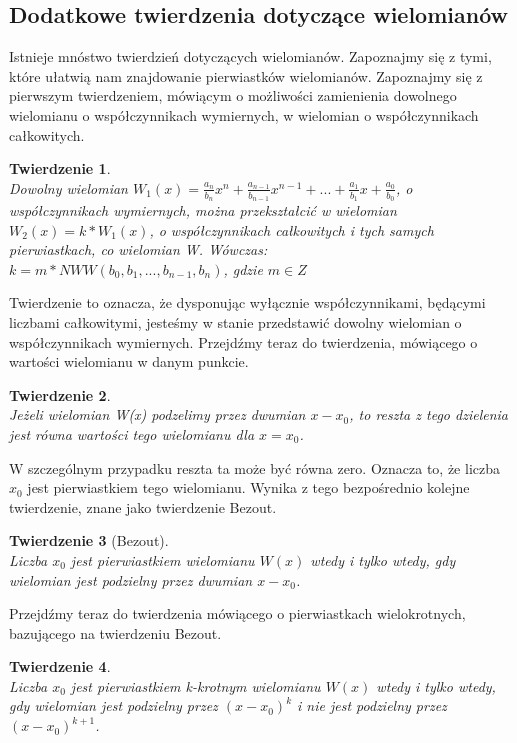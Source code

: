 \documentclass[oneside,a4paper]{book}
\newtheorem{theorem}{Twierdzenie}
\begin{document}
	\subsection{Dodatkowe twierdzenia dotyczące wielomianów}
	
	Istnieje mnóstwo twierdzień dotyczących wielomianów. Zapoznajmy się z tymi, które ułatwią nam znajdowanie pierwiastków wielomianów. Zapoznajmy się z pierwszym twierdzeniem, mówiącym o możliwości zamienienia dowolnego wielomianu o współczynnikach wymiernych, w wielomian o współczynnikach całkowitych.
	
	\begin{theorem}
		$ $\\
		Dowolny wielomian $W_1(x) = \frac{a_n}{b_n}x^n + \frac{a_{n-1}}{b_{n-1}}x^{n-1} + ... + \frac{a_1}{b_1}x + \frac{a_0}{b_0}$, o współczynnikach wymiernych, można przekształcić w wielomian $W_2(x) = k * W_1(x)$, o współczynnikach całkowitych i tych samych pierwiastkach, co wielomian W. Wówczas: \\
		$k = m * NWW(b_0, b_1, ..., b_{n-1}, b_n)$, gdzie $m\in Z$
	\end{theorem}
	
	Twierdzenie to oznacza, że dysponując wyłącznie współczynnikami, będącymi liczbami całkowitymi, jesteśmy w stanie przedstawić dowolny wielomian o współczynnikach wymiernych. Przejdźmy teraz do twierdzenia, mówiącego o wartości wielomianu w danym punkcie.
	
	\begin{theorem}
		$ $\\
		Jeżeli wielomian W(x) podzelimy przez dwumian $x - x_0$, to reszta z tego dzielenia jest równa wartości tego wielomianu dla $x = x_0$.
	\end{theorem}
	
	W szczególnym przypadku reszta ta może być równa zero. Oznacza to, że liczba $x_0$ jest pierwiastkiem tego wielomianu. Wynika z tego bezpośrednio kolejne twierdzenie, znane jako twierdzenie Bezout.
	
	\begin{theorem}[Bezout]
		$ $\\
		Liczba $x_0$ jest pierwiastkiem wielomianu $W(x)$ wtedy i tylko wtedy, gdy wielomian jest podzielny przez dwumian $x - x_0$.
	\end{theorem}
	
	Przejdźmy teraz do twierdzenia mówiącego o pierwiastkach wielokrotnych, bazującego na twierdzeniu Bezout.
	
	\begin{theorem}
		$ $\\
		Liczba $x_0$ jest pierwiastkiem k-krotnym wielomianu $W(x)$ wtedy i tylko wtedy, gdy wielomian jest podzielny przez $(x - x_0)^k$ i nie jest podzielny przez $(x - x_0)^{k+1}$.
	\end{theorem}
	
\end{document}
